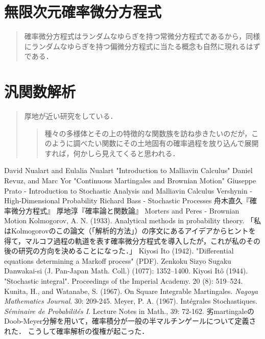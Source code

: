 \documentclass[uplatex,dvipdfmx]{jsreport}
\begin{document}
\chapter{無限次元確率微分方程式}

\begin{quotation}
    確率微分方程式はランダムなゆらぎを持つ常微分方程式であるから，同様にランダムなゆらぎを持つ偏微分方程式に当たる概念も自然に現れるはずである．
\end{quotation}

\chapter{汎関数解析}

\begin{quotation}
    厚地\cite{厚地}が近い研究をしている．
    \begin{quote}
        種々の多様体とその上の特徴的な関数族を訪ね歩きたいのだが，このように調べたい関数にその土地固有の確率過程を放り込んで展開すれば，何かしら見えてくると思われる．
    \end{quote}
\end{quotation}

\begin{thebibliography}{99}
    David Nualart and Eulalia Nualart "Introduction to Malliavin Calculus"
    Daniel Revuz, and Marc Yor "Continuous Martingales and Brownian Motion"
    Giuseppe Prato - Introduction to Stochastic Analysis and Malliavin Calculus
    Vershynin -  High-Dimensional Probability
    Richard Bass - Stochastic Processes
    舟木直久『確率微分方程式』
    厚地淳『確率論と関数論』
    Morters and Peres - Brownian Motion
    Kolmogorov, A. N. (1933). Analytical methods in probability theory. 「私はKolmogorovのこの論文（「解析的方法」）の序文にあるアイデアからヒントを得て，マルコフ過程の軌道を表す確率微分方程式を導入したが，これが私のその後の研究の方向を決めることになった．」
    Kiyosi Ito (1942). "Differential equations determining a Markoff process" (PDF). Zenkoku Sizyo Sugaku Danwakai-si (J. Pan-Japan Math. Coll.) (1077): 1352–1400.
    Kiyosi Itô (1944). "Stochastic integral". Proceedings of the Imperial Academy. 20 (8): 519–524.
    Kunita, H., and Watanabe, S. (1967). On Square Integrable Martingales. \textit{Nagoya Mathematics Journal}. 30: 209-245.
    Meyer, P. A. (1967). Intégrales Stochastiques. \textit{Séminaire de Probabilités I}. Lecture Notes in Math., 39: 72-162. 劣martingaleのDoob-Meyer分解を用いて，確率積分が一般の半マルチンゲールについて定義された．
    こうして確率解析の復権が起こった．
\end{thebibliography}
\end{document}

